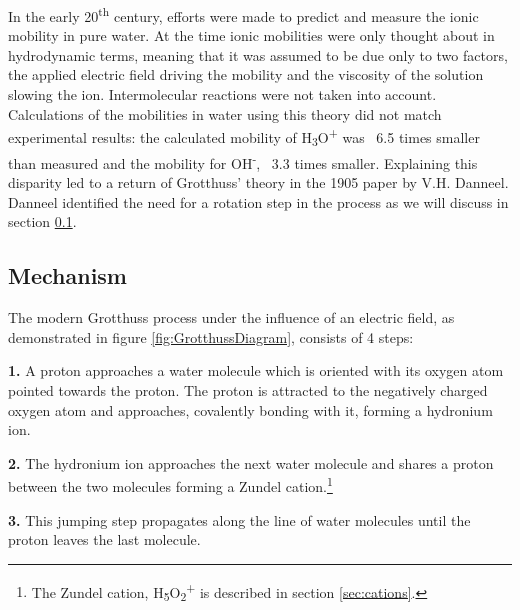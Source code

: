 \documentclass{article}
\begin{document}
\begin{multicols}{2}
In the early 20\textsuperscript{th} century, efforts were made to predict and measure the ionic mobility in pure water. At the time ionic mobilities were only thought about in hydrodynamic terms, meaning that it was assumed to be due only to two factors, the applied electric field driving the mobility and the viscosity of the solution slowing the ion. Intermolecular reactions were not taken into account.\cite{Cukiermann2005, Huckel1928} Calculations of the mobilities in water using this theory did not match experimental results: the calculated mobility of H\textsubscript{3}O\textsuperscript{+} was ~6.5 times smaller than measured and the mobility for OH\textsuperscript{-}, ~3.3 times smaller. Explaining this disparity led to a return of Grotthuss' theory in the 1905 paper by V.H. Danneel.\cite{Danneel1905} Danneel identified the need for a rotation step in the process as we will discuss in section \ref{sec:mechanism}. 

\subsection{Mechanism}
\label{sec:mechanism}
The modern Grotthuss process under the influence of an electric field, as demonstrated in figure \ref{fig:GrotthussDiagram}, consists of 4 steps:


\textbf{1.} A proton approaches a water molecule which is oriented with its oxygen atom pointed towards the proton. The proton is attracted to the negatively charged oxygen atom and approaches, covalently bonding with it, forming a hydronium ion.

\textbf{2.} The hydronium ion approaches the next water molecule and shares a proton between the two molecules forming a Zundel cation.\footnote{The Zundel cation, H\textsubscript{5}O\textsubscript{2}\textsuperscript{+} is described in section \ref{sec:cations}.}

\textbf{3.} This jumping step propagates along the line of water molecules until the proton leaves the last molecule.


\end{multicols}
\end{document}
